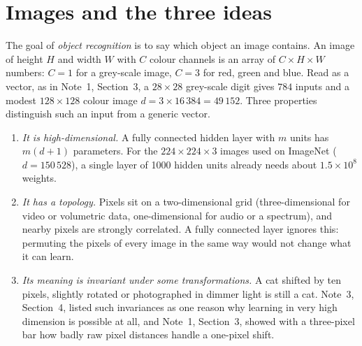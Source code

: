 \documentclass[11pt]{article}
\begin{document}

\section{Images and the three ideas}\label{sec:images}

The goal of \emph{object recognition} is to say which object an image contains. An image of height $H$ and width $W$
with $C$ colour channels is an array of $C \times H \times W$ numbers: $C = 1$ for a grey-scale image, $C = 3$ for red,
green and blue. Read as a vector, as in Note~1, Section~3, a $28 \times 28$ grey-scale digit gives $784$ inputs and a
modest $128 \times 128$ colour image $d = 3 \times 16\,384 = 49\,152$. Three properties distinguish such an input from a generic vector.

\begin{enumerate}
\item \emph{It is high-dimensional.} A fully connected hidden layer with $m$ units has $m(d + 1)$ parameters. For the
  $224 \times 224 \times 3$ images used on ImageNet ($d = 150\,528$), a single layer of 1000 hidden units already needs
  about $1.5 \times 10^8$ weights.
\item \emph{It has a topology.} Pixels sit on a two-dimensional grid (three-dimensional for video or volumetric
  data, one-dimensional for audio or a spectrum), and nearby pixels are strongly correlated. A fully connected layer
  ignores this: permuting the pixels of every image in the same way would not change what it can learn.
\item \emph{Its meaning is invariant under some transformations.} A cat shifted by ten pixels, slightly rotated or
  photographed in dimmer light is still a cat. Note~3, Section~4, listed such invariances as one reason why learning
  in very high dimension is possible at all, and Note~1, Section~3, showed with a three-pixel bar how badly raw pixel
  distances handle a one-pixel shift.
\end{enumerate}
\end{document}
